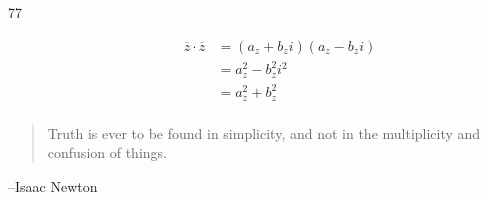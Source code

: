 \documentclass{exam}
\begin{document}
\begin{description}
    \item[77]
      \begin{align*}
        \overline{z} \cdot \overline{z} &= (a_z + b_z i) (a_z - b_z i) \\
                                        &= a_z^2 - b_z^2 i^2 \\
                                        &= a_z^2 + b_z^2 \\
      \end{align*}

  \end{description}

\else
  \vspace{10 cm}
  \begin{quote}
    \begin{em}
      Truth is ever to be found in simplicity, and not in the multiplicity and confusion of things.
    \end{em}
  \end{quote}

  \hspace{1 cm} --Isaac Newton


\fi
\end{document}
